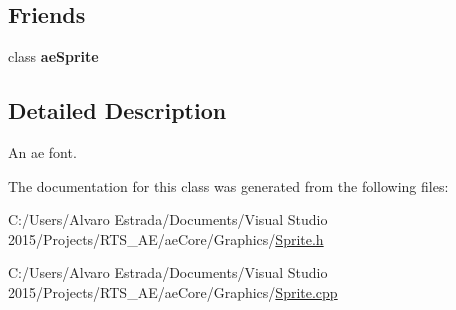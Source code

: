 \subsection*{Friends}
\begin{DoxyCompactItemize}
\item 
class {\bfseries ae\+Sprite}\hypertarget{classae_core_1_1ae_font_a450e94d8bab3fa5d26d3663ba55b8ba3}{}\label{classae_core_1_1ae_font_a450e94d8bab3fa5d26d3663ba55b8ba3}

\end{DoxyCompactItemize}


\subsection{Detailed Description}
An ae font. 

The documentation for this class was generated from the following files\+:\begin{DoxyCompactItemize}
\item 
C\+:/\+Users/\+Alvaro Estrada/\+Documents/\+Visual Studio 2015/\+Projects/\+R\+T\+S\+\_\+\+A\+E/ae\+Core/\+Graphics/\hyperlink{_sprite_8h}{Sprite.\+h}\item 
C\+:/\+Users/\+Alvaro Estrada/\+Documents/\+Visual Studio 2015/\+Projects/\+R\+T\+S\+\_\+\+A\+E/ae\+Core/\+Graphics/\hyperlink{_sprite_8cpp}{Sprite.\+cpp}\end{DoxyCompactItemize}
